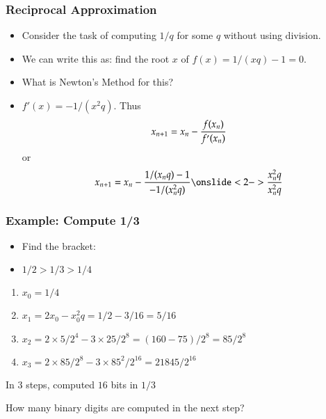 \documentclass[10pt]{beamer}
\begin{document}
\begin{frame}
\frametitle{Reciprocal Approximation}
\begin{itemize}
  \item Consider the task of computing $1/q$ for some $q$ without
    using division.  
  \item We can write this as: find the root $x$ of $f(x) = 1/(xq)-1 =
    0$.
  \item What is Newton's Method for this?
  \item $f'(x) = -1/(x^2q)$.  Thus
  \begin{equation*}
       x_{n+1} = x_n - {f(x_n)\over f'(x_n)}
  \end{equation*}
  or 
  \begin{equation*}
       x_{n+1} = x_n - { 1/(x_nq)-1\over -1/(x_n^2q) } \onslide<2->{{ x_n^2q\over x_n^2q }}
  \end{equation*}
\end{itemize}
\end{frame}
\begin{frame}
\frametitle{Example: Compute 1/3}

\begin{itemize}
  \item Find the bracket:
  \item $1/2 > 1/3 > 1/4$
\end{itemize}
\begin{enumerate}
\item $x_0 = 1/4$
\item $x_1 = 2 x_0 - x_0^2q = 1/2 - 3/16 = 5/16$
\item $x_2 = 2 \times 5/2^4 - 3 \times 25/2^8 = (160-75)/2^8=85/2^8$
\item $x_3 = 2 \times 85/2^8 - 3 \times 85^2/2^{16} = 21845/2^{16}$
\end{enumerate}
In $3$ steps, computed $16$ bits in $1/3$

\begin{alertblock}{}
How many binary digits are computed in the next step?
\end{alertblock}

\end{frame}
\end{document}

